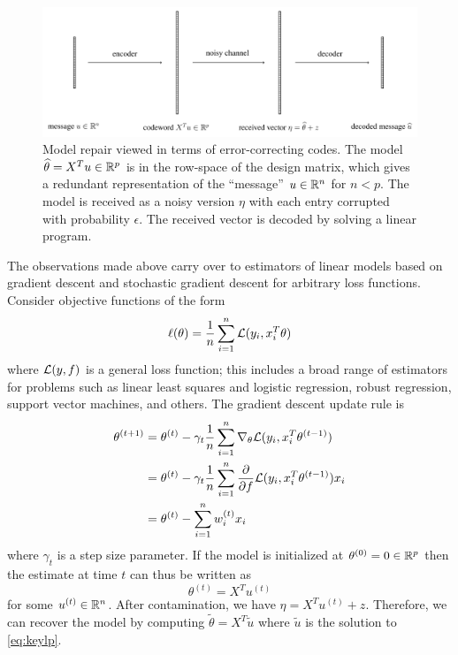 \begin{figure}[t]
  \includegraphics[width=1.0\textwidth]{fig/code}
  \caption{Model repair viewed in terms of error-correcting codes. The model $\widehat\theta = X^T u\in\mathbb{R}^p$ is in the row-space of the design matrix, which gives a redundant representation of the ``message'' $u\in\mathbb{R}^n$ for $n < p$. The model is received as a noisy version $\eta$ with each entry corrupted with probability $\epsilon$. The received vector is decoded by solving a linear program.}
  \label{fig:code}
\end{figure}

The observations made above carry over to estimators of linear models based on gradient descent and stochastic gradient descent for arbitrary loss functions. Consider objective functions of the form
\begin{equation}
  \ell(\theta) = \frac{1}{n} \sum_{i=1}^n \L(y_i, x_i^T \theta)\label{eq:gen-obj}
\end{equation}
where ${\mathcal L}(y,f)$ is a general loss function; this includes
a broad range of estimators for problems such as linear least squares and logistic regression, robust regression, support vector machines, and others. The gradient descent update rule is
\begin{align}
  \theta^{(t+1)} &= \theta^{(t)} - \gamma_t \frac{1}{n} \sum_{i=1}^n \nabla_\theta \L(y_i, x_i^T \theta^{(t-1)}) \\
  &= \theta^{(t)} - \gamma_t \frac{1}{n} \sum_{i=1}^n \frac{\partial}{\partial f} \L(y_i, x_i^T \theta^{(t-1)}) x_i \\
  &= \theta^{(t)} - \sum_{i=1}^n w_i^{(t)} x_i
\end{align}
where $\gamma_t$ is a step size parameter. If the model is initialized at $\theta^{(0)}= 0\in\mathbb{R}^p$ then the estimate at time $t$ can thus be written as
\begin{equation}
  \theta^{(t)} = X^T u^{(t)}
\end{equation}
for some $u^{(t)}\in \mathbb{R}^n$. After contamination, we have $\eta = X^T u^{(t)} + z$. Therefore, we can recover the model
by computing  $\tilde\theta = X^T \tilde u$ where $\tilde u$ is the solution to \eqref{eq:keylp}.


